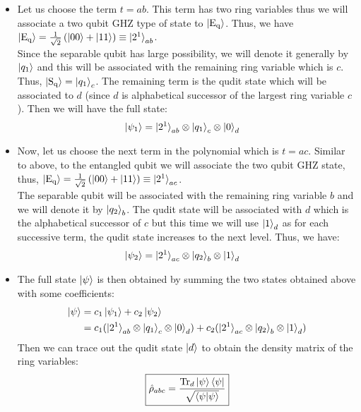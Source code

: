 \documentclass{scrartcl}
\begin{document}
\begin{itemize}
    \item Let us choose the term $t = ab$. This term has two ring variables thus we will associate a two qubit GHZ type of state to $\ket{\mathrm{E_q}}$. Thus, we have $\ket{\mathrm{E_q}} = \frac{1}{\sqrt{2}}\left( \ket{00} + \ket{11} \right)\equiv \ket{2^1}_{ab}$. \\[0.3cm]Since the separable qubit has large possibility, we will denote it generally by $\ket{q_1}$ and this will be associated with the remaining ring variable which is $c$. Thus, $\ket{\mathrm{S_q}} = \ket{q_1}_c$. The remaining term is the qudit state which will be associated to $d$ (since $d$ is alphabetical successor of the largest ring variable $c$). Then we will have the full state:
\begin{align*}
    \ket{\psi_1} &= \ket{2^1}_{ab}\otimes\ket{q_1}_c\otimes\ket{0}_d 
\end{align*}
\item Now, let us choose the next term in the polynomial which is $t = ac$. Similar to above, to the entangled qubit we will associate the two qubit GHZ state, thus, $\ket{\mathrm{E_q}} = \frac{1}{\sqrt{2}}\left( \ket{00} + \ket{11} \right)\equiv \ket{2^1}_{ac}$.\\[0.3cm] The separable qubit will be associated with the remaining ring variable $b$ and we will denote it by $\ket{q_2}_b$. The qudit state will be associated with $d$ which is the alphabetical successor of $c$ but this time we will use $\ket{1}_d$ as for each successive term, the qudit state increases to the next level. Thus, we have:
\begin{align*}
    \ket{\psi_2} &= \ket{2^1}_{ac}\otimes\ket{q_2}_b\otimes\ket{1}_d
\end{align*}
\item The full state $\ket{\psi}$ is then obtained by summing the two states obtained above with some coefficients:
\begin{align*}
    \ket{\psi} &= c_1\ket{\psi_1} + c_2\ket{\psi_2} \\
    &=c_1(\ket{2^1}_{ab}\otimes\ket{q_1}_c\otimes\ket{0}_d )+ c_2(\ket{2^1}_{ac}\otimes\ket{q_2}_b\otimes\ket{1}_d)
\end{align*}
Then we can trace out the qudit state $\ket{d}$ to obtain the density matrix of the ring variables:
$$\boxed{\hat{\rho}_{abc}=\frac{\Tr_d{\ket{\psi}\bra{\psi}}}{\sqrt{\braket{\psi|\psi}}}} $$
\end{itemize}
\end{document}

